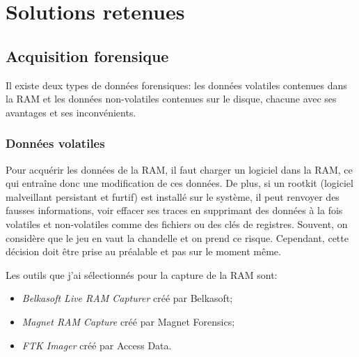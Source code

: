 
\chapter{Solutions retenues}










\section{Acquisition forensique}

Il existe deux types de données forensiques: les données volatiles contenues dans la RAM et les données non-volatiles contenues sur le disque, chacune avec ses avantages et ses inconvénients.





\subsection{Données volatiles}

Pour acquérir les données de la RAM, il faut charger un logiciel dans la RAM, ce qui entraîne donc une modification de ces données. De plus, si un rootkit (logiciel malveillant persistant et furtif) est installé sur le système, il peut renvoyer des fausses informations, voir effacer ses traces en supprimant des données à la fois volatiles et non-volatiles comme des fichiers ou des clés de registres. Souvent, on considère que le jeu en vaut la chandelle et on prend ce risque. Cependant, cette décision doit être prise au préalable et pas sur le moment même. \cite{5}

Les outils que j'ai sélectionnés pour la capture de la RAM sont:

\begin{itemize}
    \item \textit{Belkasoft Live RAM Capturer} créé par Belkasoft;
    \item \textit{Magnet RAM Capture} créé par Magnet Forensics;
    \item \textit{FTK Imager} créé par Access Data.
\end{itemize}

